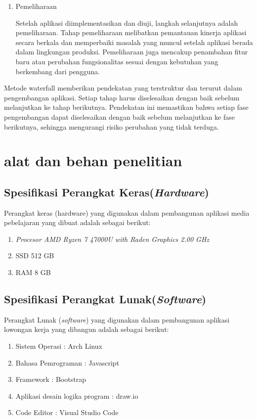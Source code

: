 \begin{enumerate}[leftmargin=1cm, itemindent=0.6cm,labelwidth=15pt, labelsep=5pt, listparindent=1cm,align=left]
\item Pemeliharaan

    Setelah aplikasi diimplementasikan dan diuji, langkah selanjutnya adalah pemeliharaan. Tahap pemeliharaan melibatkan pemantauan kinerja aplikasi secara berkala dan memperbaiki masalah yang muncul setelah aplikasi berada dalam lingkungan produksi. Pemeliharaan juga mencakup penambahan fitur baru atau perubahan fungsionalitas sesuai dengan kebutuhan yang berkembang dari pengguna.

\end{enumerate}

Metode waterfall memberikan pendekatan yang terstruktur dan terurut dalam pengembangan aplikasi. Setiap tahap harus diselesaikan dengan baik sebelum melanjutkan ke tahap berikutnya. Pendekatan ini memastikan bahwa setiap fase pengembangan dapat diselesaikan dengan baik sebelum melanjutkan ke fase berikutnya, sehingga mengurangi risiko perubahan yang tidak terduga.

\section{alat dan behan penelitian}
\subsection{Spesifikasi Perangkat Keras(\textit{Hardware})}
    Perangkat keras (hardware) yang digunakan dalam pembangunan aplikasi media pebelajaran yang dibuat adalah sebagai berikut:
\begin{enumerate}
    \item \textit{Procesor AMD Ryzen 7 47000U with Raden Graphics 2.00 GHz}
    \item SSD 512 GB
    \item RAM 8 GB
\end{enumerate}

\subsection{Spesifikasi Perangkat Lunak(\textit{Software})}
    Perangkat Lunak (\textit{software}) yang digunakan dalam pembangunan aplikasi lowongan kerja yang dibangun adalah sebagai berikut:

\begin{enumerate}
    \item Sistem Operasi : Arch Linux
    \item Bahasa Pemrograman : Javascript
    \item Framework : Bootstrap
    \item Aplikasi desain logika program : draw.io
    \item Code Editor : Visual Studio Code
\end{enumerate}
